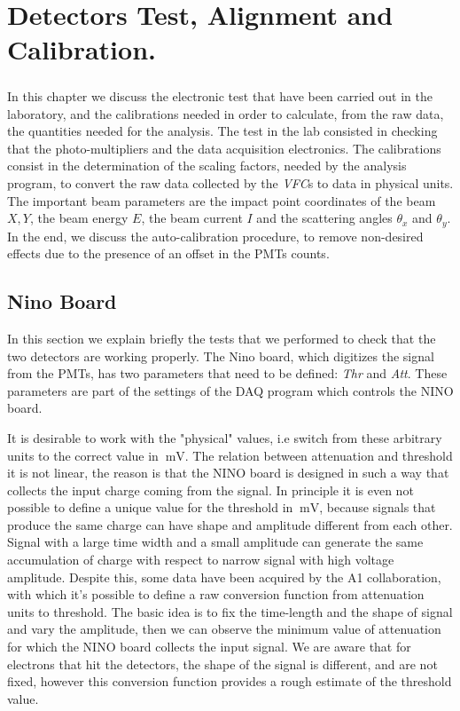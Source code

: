 \chapter{Detectors Test, Alignment and Calibration.} \label{analysis}

\paragraph{}
In this chapter we discuss the electronic test that have been carried out in the laboratory, and the calibrations needed in order to calculate, from the raw data, the quantities needed for the analysis.
The test in the lab consisted in checking that the photo-multipliers and the data acquisition electronics.
The calibrations consist in the determination of the scaling factors, needed by the analysis program, to convert the raw data collected by the \textit{VFC}s to data in physical units. The important beam parameters are the impact point coordinates of the beam $X,Y$, the beam energy $E$, the beam current $I$ and the scattering angles $\theta_{x}$ and $\theta_{y}$. In the end, we discuss the auto-calibration procedure, to remove non-desired effects due to the presence of an offset in the PMTs counts.


\section{Nino Board}
In this section we explain briefly the tests that we performed to check that the two detectors are working properly.
The Nino board, which digitizes the signal from the PMTs, has two parameters that need to be defined: \textit{Thr} and \textit{Att}. These parameters are part of the settings of the DAQ program which controls the NINO board.

It is desirable to work with the "physical" values, i.e switch from these arbitrary units to the correct value in $\SI{}{\milli \volt}$. The relation between attenuation and threshold it is not linear, the reason is that the NINO board is designed in such a way that collects the input charge coming from the signal. In principle it is even not possible to define a unique value for the threshold in $\SI{}{\milli \volt}$, because signals that produce the same charge can have shape and amplitude different from each other.
Signal with a large time width and a small amplitude can generate the same accumulation of charge with respect to narrow signal with high voltage amplitude. Despite this, some data have been acquired by the A1 collaboration, with which it's possible to define a raw conversion function from attenuation units to threshold. The basic idea is to fix the time-length and the shape of signal and vary the amplitude, then we can observe the minimum value of attenuation for which the NINO board collects the input signal. We are aware that for electrons that hit the detectors, the shape of the signal is different, and are not fixed, however this conversion function provides a rough estimate of the threshold value.

